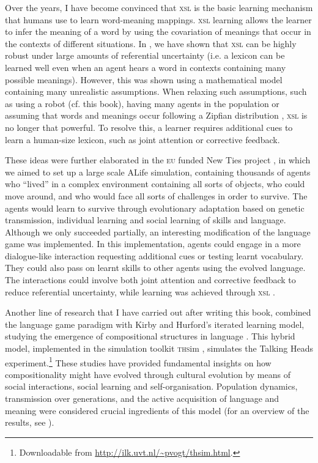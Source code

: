 Over the years, I have become convinced that {\scshape xsl} is the basic learning mechanism that humans use to learn word-meaning mappings. {\scshape xsl} learning allows the learner to infer the meaning of a word by using the covariation of meanings that occur in the contexts of different situations. In \citet{smithetal:2006}, we have shown that {\scshape xsl} can be highly robust under large amounts of referential uncertainty (i.e. a lexicon can be learned well even when an agent hears a word in contexts containing many possible meanings). However, this was shown using a mathematical model containing many unrealistic assumptions. When relaxing such assumptions, such as using a robot (cf. this book), having many agents in the population \citep{vogtcoumans:2003} or assuming that words and meanings occur following a Zipfian distribution \citep{vogt:2012}, {\scshape xsl} is no longer that powerful. To resolve this, a learner requires additional cues to learn a human-size lexicon, such as joint attention or corrective feedback. 

These ideas were further elaborated in the {\scshape eu} funded New Ties project \citep{gilbertetal:2006}, in which we aimed to set up a large scale ALife simulation, containing thousands of agents who ``lived'' in a complex environment containing all sorts of objects, who could move around, and who would face all sorts of challenges in order to survive. The agents would learn to survive through evolutionary adaptation based on genetic transmission, individual learning and social learning of skills and language. Although we only succeeded partially, an interesting modification of the language game was implemented. In this implementation, agents could engage in a more dialogue-like interaction requesting additional cues or testing learnt vocabulary. They could also pass on learnt skills to other agents using the evolved language. The interactions could involve both joint attention and corrective feedback to reduce referential uncertainty, while learning was achieved through {\scshape xsl} \citep{vogtdivina:2007,vogthaasdijk:2010}.

Another line of research that I have carried out after writing this book, combined the language game paradigm with Kirby and Hurford's \citeyear{kirbyhurford:2002} {\sc iterated learning model}, studying the emergence of compositional structures in language \citep{vogt:2005a,vogt:2005b}. This hybrid model, implemented in the simulation toolkit {\scshape ths}im \citep{vogt:2003c}, simulates the Talking Heads experiment.\footnote{Downloadable from \url{http://ilk.uvt.nl/\~pvogt/thsim.html}.} These studies have provided fundamental insights on how compositionality might have evolv\-ed through cultural evolution by means of social interactions, social learning and self-organisation. Population dynamics, transmission over generations, and the active acquisition of language and meaning were considered crucial ingredients of this model (for an overview of the results, see \citealt{vogt:2007b}).  

